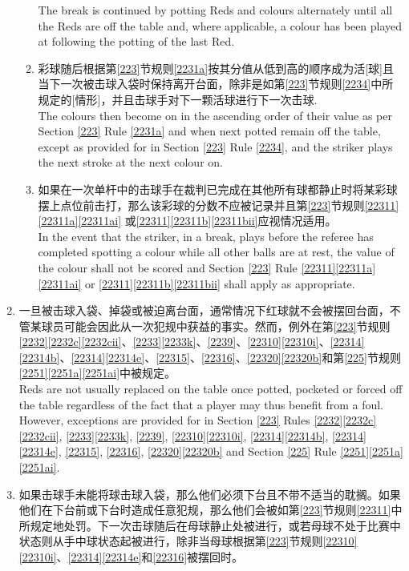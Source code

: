 \begin{enumerate}[label=(\alph*)]
\begin{enumerate}[label=(\roman*)]
        The break is continued by potting Reds and colours alternately until all the Reds are off the table and, where applicable, a colour has been played at following the potting of the last Red.
        \item \label{2233hiii}彩球随后根据第\ref{223}节规则\ref{2231a}按其分值从低到高的顺序成为活[球]且当下一次被击球入袋时保持离开台面，除非是如第\ref{223}节规则\ref{2234}中所规定的[情形]，并且击球手对下一颗活球进行下一次击球.\\
        The colours then become on in the ascending order of their value as per Section \ref{223} Rule \ref{2231a} and when next potted remain off the table, except as provided for in Section \ref{223} Rule \ref{2234}, and the striker plays the next stroke at the next colour on.
        \item 如果在一次单杆中的击球手在裁判已完成在其他所有球都静止时将某彩球摆上点位前击打，那么该彩球的分数不应被记录并且第\ref{223}节规则\ref{22311}\ref{22311a}\ref{22311ai} 或\ref{22311}\ref{22311b}\ref{22311bii}应视情况适用。\\
        In the event that the striker, in a break, plays before the referee has completed spotting a colour while all other balls are at rest, the value of the colour shall not be scored and Section \ref{223} Rule \ref{22311}\ref{22311a} \ref{22311ai} or \ref{22311}\ref{22311b}\ref{22311bii} shall apply as appropriate.
    \end{enumerate}
    \item 一旦被击球入袋、掉袋或被迫离台面，通常情况下红球就不会被摆回台面，不管某球员可能会因此从一次犯规中获益的事实。然而，例外在第\ref{223}节规则\ref{2232}\ref{2232c}\ref{2232cii}、\ref{2233}\ref{2233k}、\ref{2239}、\ref{22310}\ref{22310i}、\ref{22314}\ref{22314b}、\ref{22314}\ref{22314e}、\ref{22315}、\ref{22316}、\ref{22320}\ref{22320b}和第\ref{225}节规则\ref{2251}\ref{2251a}\ref{2251ai}中被规定。\\
    Reds are not usually replaced on the table once potted, pocketed or forced off the table regardless of the fact that a player may thus benefit from a foul. However, exceptions are provided for in Section \ref{223} Rules \ref{2232}\ref{2232c}\ref{2232cii}, \ref{2233}\ref{2233k}, \ref{2239}, \ref{22310}\ref{22310i}, \ref{22314}\ref{22314b}, \ref{22314}\ref{22314e}, \ref{22315}, \ref{22316}, \ref{22320}\ref{22320b} and Section \ref{225} Rule \ref{2251}\ref{2251a}\ref{2251ai}.
    \item 如果击球手未能将球击球入袋，那么他们必须下台且不带不适当的耽搁。如果他们在下台前或下台时造成任意犯规，那么他们会被如第\ref{223}节规则\ref{22311}中所规定地处罚。下一次击球随后在母球静止处被进行，或若母球不处于比赛中状态则从手中球状态起被进行，除非当母球根据第\ref{223}节规则\ref{22310}\ref{22310i}、\ref{22314}\ref{22314e}和\ref{22316}被摆回时。\\

\end{enumerate}
